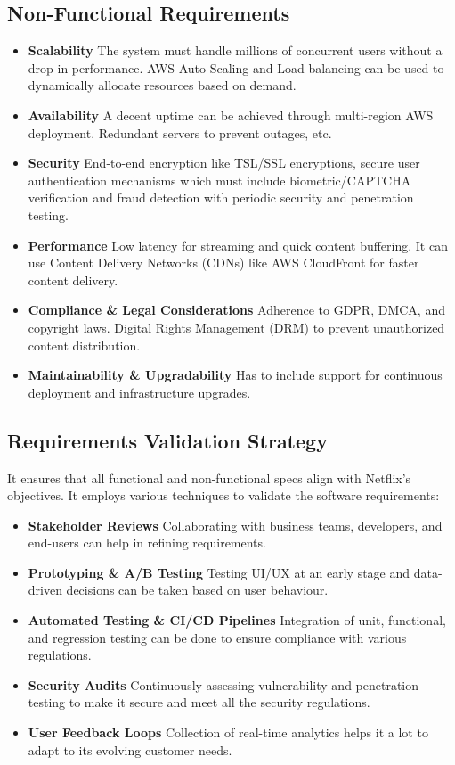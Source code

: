 \documentclass[a4paper,10pt,twoside]{article}
\begin{document}
\subsection{Non-Functional Requirements}
\begin{itemize}
    \item \textbf{Scalability} The system must handle millions of concurrent users without a drop in performance. AWS Auto Scaling and Load balancing can be used to dynamically allocate resources based on demand.
    \item \textbf{Availability} A decent uptime can be achieved through multi-region AWS deployment. Redundant servers to prevent outages, etc.
    \item \textbf{Security} End-to-end encryption like TSL/SSL encryptions, secure user authentication mechanisms which must include biometric/CAPTCHA verification and fraud detection with periodic security and penetration testing.
    \item \textbf{Performance} Low latency for streaming and quick content buffering. It can use Content Delivery Networks (CDNs) like AWS CloudFront for faster content delivery.
    \item \textbf{Compliance \& Legal Considerations} Adherence to GDPR, DMCA, and copyright laws. Digital Rights Management (DRM) to prevent unauthorized content distribution.
    \item \textbf{Maintainability \& Upgradability} Has to include support for continuous deployment and infrastructure upgrades.
\end{itemize}

\subsection{Requirements Validation Strategy}
It ensures that all functional and non-functional specs align with Netflix’s objectives. It employs various techniques to validate the software requirements:
\begin{itemize}
    \item \textbf{Stakeholder Reviews} Collaborating with business teams, developers, and end-users can help in refining requirements.
    \item \textbf{Prototyping \& A/B Testing} Testing UI/UX at an early stage and data-driven decisions can be taken based on user behaviour.
    \item \textbf{Automated Testing \& CI/CD Pipelines} Integration of unit, functional, and regression testing can be done to ensure compliance with various regulations.
    \item \textbf{Security Audits} Continuously assessing vulnerability and penetration testing to make it secure and meet all the security regulations.
    \item \textbf{User Feedback Loops} Collection of real-time analytics helps it a lot to adapt to its evolving customer needs.
\end{itemize}
\end{document}
